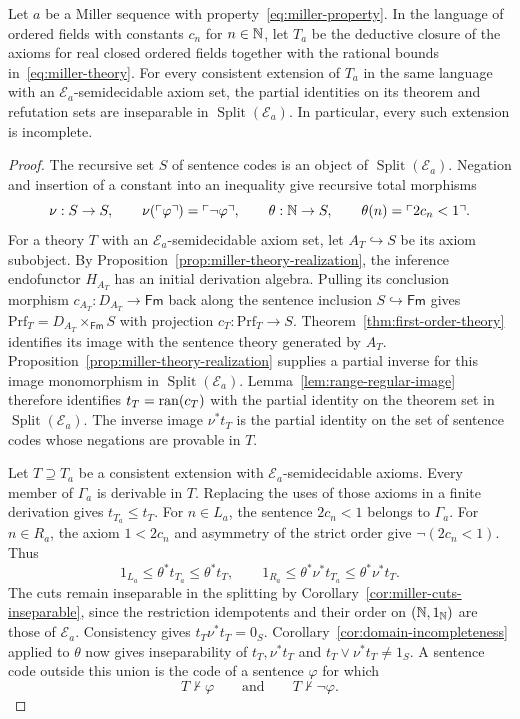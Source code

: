 \begin{theorem}\label{thm:miller-incompleteness}
Let $a$ be a Miller sequence with property~\eqref{eq:miller-property}.
In the language of ordered fields with constants $c_n$ for $n\in\mathbb N$,
let $T_a$ be the deductive closure of the axioms for real closed
ordered fields together with the rational bounds in~\eqref{eq:miller-theory}.
For every consistent extension of $T_a$ in the same language with
an $\mathcal E_a$-semidecidable axiom set, the partial identities on its
theorem and refutation sets are inseparable in
$\operatorname{Split}(\mathcal E_a)$.
In particular, every such extension is incomplete.
\end{theorem}
\begin{proof}
The recursive set $S$ of sentence codes is an
object of $\operatorname{Split}(\mathcal E_a)$. Negation and insertion
of a constant into an inequality give recursive total morphisms
\[
 \nu:S\to S,\qquad
 \nu(\ulcorner\varphi\urcorner)=\ulcorner\neg\varphi\urcorner,
 \qquad
 \theta:\mathbb N\to S,\qquad
 \theta(n)=\ulcorner 2c_n<1\urcorner.
\]
For a theory $T$ with an $\mathcal E_a$-semidecidable axiom set,
let $A_T\hookrightarrow S$ be its axiom subobject. By
Proposition~\ref{prop:miller-theory-realization}, the inference
endofunctor $H_{A_T}$ has an initial derivation algebra. Pulling its
conclusion morphism $c_{A_T}:D_{A_T}\to\mathsf{Fm}$ back along the sentence
inclusion $S\hookrightarrow\mathsf{Fm}$ gives
$\mathrm{Prf}_T=D_{A_T}\times_{\mathsf{Fm}}S$ with projection
$c_T:\mathrm{Prf}_T\to S$.
Theorem~\ref{thm:first-order-theory} identifies its image with the
sentence theory generated by $A_T$.
Proposition~\ref{prop:miller-theory-realization} supplies a partial
inverse for this image monomorphism in
$\operatorname{Split}(\mathcal E_a)$.
Lemma~\ref{lem:range-regular-image} therefore identifies
$t_T=\operatorname{ran}(c_T)$ with the partial identity on the theorem set in
$\operatorname{Split}(\mathcal E_a)$.
The inverse image $\nu^*t_T$ is the partial identity on the set of
sentence codes whose negations are provable in $T$.

Let $T\supseteq T_a$ be a consistent extension with
$\mathcal E_a$-semidecidable axioms. Every member of $\Gamma_a$ is derivable in $T$. Replacing the uses of those
axioms in a finite derivation gives $t_{T_a}\le t_T$. For $n\in L_a$, the
sentence $2c_n<1$ belongs to $\Gamma_a$. For $n\in R_a$, the
axiom $1<2c_n$ and asymmetry of the strict order give
$\neg(2c_n<1)$.
Thus
\[
 1_{L_a}\le\theta^*t_{T_a}\le\theta^*t_T,\qquad
 1_{R_a}\le\theta^*\nu^*t_{T_a}\le\theta^*\nu^*t_T .
\]
The cuts remain inseparable in the splitting by
Corollary~\ref{cor:miller-cuts-inseparable}, since the restriction
idempotents and their order on $(\mathbb N,1_{\mathbb N})$ are those of $\mathcal E_a$.
Consistency gives $t_T\nu^*t_T=0_S$. Corollary~\ref{cor:domain-incompleteness}
applied to $\theta$ now gives inseparability of $t_T,\nu^*t_T$ and
$t_T\vee\nu^*t_T\ne1_S$. A sentence code outside this union
is the code of a sentence $\varphi$ for which
\[
 T\nvdash\varphi \qquad\text{and}\qquad T\nvdash\neg\varphi .
\]

\end{proof}

